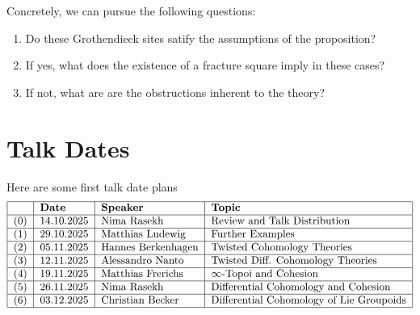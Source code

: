 \documentclass[a4paper]{book}
\theoremstyle{definition}
\theoremstyle{remark}
\numberwithin{equation}{section}
\begin{document}
Concretely, we can pursue the following questions:
\begin{enumerate}
  \item Do these Grothendieck sites satify the assumptions of the proposition?
  \item If yes, what does the existence of a fracture square imply in these cases?
  \item If not, what are are the obstructions inherent to the theory?
\end{enumerate}


  
\section{Talk Dates}
Here are some first talk date plans
\[
 \begin{tabular}{|l|l|l|l|}
  \hline 
  & \textbf{Date} & \textbf{Speaker} & \textbf{Topic} \\ \hline 
  (0) & 14.10.2025 & Nima Rasekh & Review and Talk Distribution \\ \hline
  (1) & 29.10.2025 & Matthias Ludewig & Further Examples\\ \hline
  (2) & 05.11.2025 & Hannes Berkenhagen & Twisted Cohomology Theories\\ \hline
  (3) & 12.11.2025 & Alessandro Nanto & Twisted Diff. Cohomology Theories\\ \hline
  (4) & 19.11.2025 & Matthias Frerichs & $\infty$-Topoi and Cohesion\\ \hline
  (5) & 26.11.2025 & Nima Rasekh & Differential Cohomology and Cohesion\\ \hline
  (6) & 03.12.2025 & Christian Becker & Differential Cohomology of Lie Groupoids \\ \hline
 \end{tabular} 
\]
\end{document}
